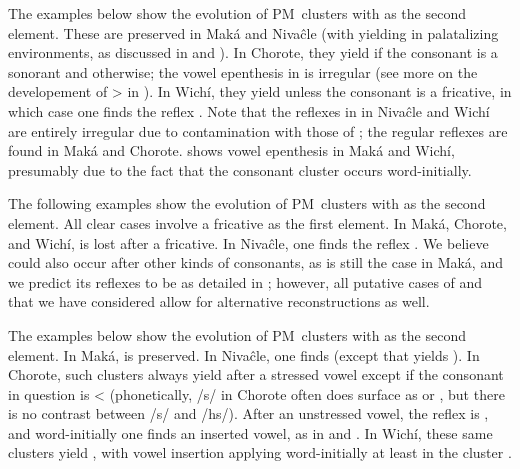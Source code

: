 The examples below show the evolution of PM~clusters with  as the second element. These are preserved in Maká and Nivaĉle (with  yielding  in palatalizing environments, as discussed in  and ). In Chorote, they yield  if the consonant is a sonorant and  otherwise; the vowel epenthesis in  is irregular (see more on the developement of  >  in ). In Wichí, they yield  unless the consonant is a fricative, in which case one finds the reflex . Note that the reflexes in  in Nivaĉle and Wichí are entirely irregular due to contamination with those of ; the regular reflexes are found in Maká and Chorote.  shows vowel epenthesis in Maká and Wichí, presumably due to the fact that the consonant cluster occurs word-initially.

\begin{exe}
    \ex \armadillonomaka
    \ex \noseobl
    \ex \sleepiness \label{nx-sleepiness}
    \ex \smellv
    \ex \pathpl
    \ex \beard \label{px-beard}
    \ex \uncle \label{tx-uncle}
    \ex \eggits
    \ex \headits
    \ex \tuscaf
    \ex \tuscat
    \ex \tuscag
    \ex \teach \label{jx-teach}
\end{exe}

The following examples show the evolution of PM~clusters with  as the second element. All clear cases involve a fricative as the first element. In Maká, Chorote, and Wichí,  is lost after a fricative. In Nivaĉle, one finds the reflex . We believe  could also occur after other kinds of consonants, as is still the case in Maká, and we predict its reflexes to be as detailed in ; however, all putative cases of  and  that we have considered allow for alternative reconstructions as well.

\begin{exe}
    \ex \killbird
    \ex \finger
    \ex \redquebracho
    \ex \thunder
    \ex \meat
\end{exe}

The examples below show the evolution of PM~clusters with  as the second element. In Maká,  is preserved. In Nivaĉle, one finds  (except that  yields ). In Chorote, such clusters always yield  after a stressed vowel except if the consonant in question is  <  (phonetically, /s/ in Chorote often does surface as  or , but there is no contrast between /s/ and /hs/). After an unstressed vowel, the reflex is  , and word-initially one finds an inserted vowel, as in  and . In Wichí, these same clusters yield , with vowel insertion applying word-initially at least in the cluster  .

